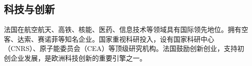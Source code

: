 \subsection{科技与创新}

法国在航空航天、高铁、核能、医药、信息技术等领域具有国际领先地位。拥有空客、达索、赛诺菲等知名企业。国家重视科研投入，设有国家科研中心（CNRS）、原子能委员会（CEA）等顶级研究机构。法国鼓励创新创业，支持初创企业发展，是欧洲科技创新的重要引擎之一。
